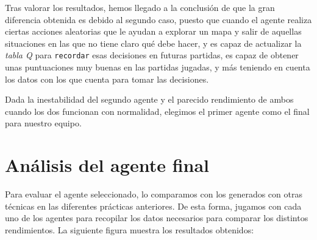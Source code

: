 \documentclass[12pt]{article}
\begin{document}
Tras valorar los resultados, hemos llegado a la conclusión de que la gran diferencia obtenida es debido al segundo caso, puesto que cuando el agente realiza ciertas acciones aleatorias que le ayudan a explorar un mapa y salir de aquellas situaciones en las que no tiene claro qué debe hacer, y es capaz de actualizar la \textit{tabla Q} para \texttt{recordar} esas decisiones en futuras partidas, es capaz de obtener unas puntuaciones muy buenas en las partidas jugadas, y más teniendo en cuenta los datos con los que cuenta para tomar las decisiones.

\vspace{0.5cm}

Dada la inestabilidad del segundo agente y el parecido rendimiento de ambos cuando los dos funcionan con normalidad, elegimos el primer agente como el final para nuestro equipo.

\newpage
\section{Análisis del agente final}


Para evaluar el agente seleccionado, lo comparamos con los generados con otras técnicas en las diferentes prácticas anteriores. De esta forma, jugamos con cada uno de los agentes para recopilar los datos necesarios para comparar los distintos rendimientos. La siguiente figura muestra los resultados obtenidos:
\end{document}
